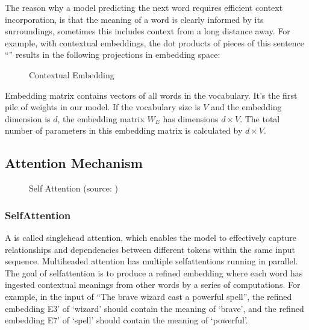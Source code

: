 \documentclass[letterpaper,11pt,english]{sphinxmanual}
\begin{document}
\sphinxAtStartPar
The reason why a model predicting the next word requires efficient
context incorporation, is that the meaning of a word is clearly informed
by its surroundings, sometimes this includes context from a long
distance away. For example, with contextual embeddings, the dot products
of pieces of this sentence “” results in the
following projections in embedding space:

\begin{figure}[htbp]
\centering
\capstart

\noindent{}
\caption{Contextual Embedding}\label{\detokenize{pretraining:id13}}\end{figure}

\sphinxAtStartPar
Embedding matrix contains vectors of all words in the vocabulary. It’s
the first pile of weights in our model. If the vocabulary size is
\(V\) and the embedding dimension is \(d\), the embedding matrix
\(W_E\) has dimensions \(d \times V\). The total number of
parameters in this embedding matrix is calculated by \(d \times V\).


\subsection{Attention Mechanism}
\label{\detokenize{pretraining:attention-mechanism}}
\begin{figure}[htbp]
\centering
\capstart

\noindent{}
\caption{Self Attention (source: )}\label{\detokenize{pretraining:id14}}\end{figure}


\subsubsection{Self\sphinxhyphen{}Attention}
\label{\detokenize{pretraining:self-attention}}
\sphinxAtStartPar
A  is called single\sphinxhyphen{}head attention, which enables the
model to effectively capture relationships and dependencies between
different tokens within the same input sequence. Multi\sphinxhyphen{}headed attention
has multiple self\sphinxhyphen{}attentions running in parallel. The goal of
self\sphinxhyphen{}attention is to produce a refined embedding where each word has
ingested contextual meanings from other words by a series of
computations. For example, in the input of “The brave wizard cast a
powerful spell”, the refined embedding E3’ of ‘wizard’ should contain
the meaning of ‘brave’, and the refined embedding E7’ of ‘spell’ should
contain the meaning of ‘powerful’.
\end{document}
